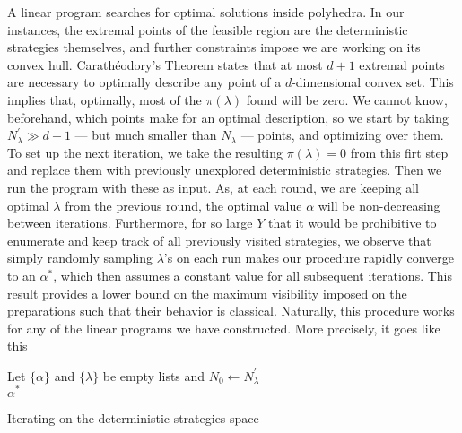 	A linear program searches for optimal solutions inside polyhedra. In our instances, the extremal points of the feasible region are the deterministic strategies themselves, and further constraints impose we are working on its convex hull. Carathéodory's Theorem \cite{rockafellar_convexanalysis_1970} states that at most $d+1$ extremal points are necessary to optimally describe any point of a $d$-dimensional convex set. This implies that, optimally, most of the $\pi(\lambda)$ found will be zero. We cannot know, beforehand, which points make for an optimal description, so we start by taking $N_\lambda^\prime \gg d+1$ --- but much smaller than $N_\lambda$ --- points, and optimizing over them. To set up the next iteration, we take the resulting $\pi(\lambda) = 0$  from this firt step and replace them with previously unexplored deterministic strategies. Then we run the program with these as input. As, at each round, we are keeping all optimal $\lambda$ from the previous round, the optimal value $\alpha$ will be non-decreasing between iterations. Furthermore, for so large $Y$ that it would be prohibitive to enumerate and keep track of all previously visited strategies, we observe that simply randomly sampling $\lambda$'s on each run makes our procedure rapidly converge to an $\alpha^*$, which then assumes a constant value for all subsequent iterations. This result provides a lower bound on the maximum visibility imposed on the preparations such that their behavior is classical. Naturally, this procedure works for any of the linear programs we have constructed. More precisely, it goes like this

	\IncMargin{1em}
	\begin{algorithm}[ht!]
		\Output{$\alpha^*$}
		\BlankLine
		\nonl Let $\{ \alpha \}$ and $\{ \lambda \}$ be empty lists and $N_0 \longleftarrow N_\lambda^\prime$ \\
		\Return $\alpha^*$
		\vspace{.5em}
		\caption{Iterating on the deterministic strategies space}
		\label{algo:iterative-strategy}
	\end{algorithm}
	\DecMargin{1em}

